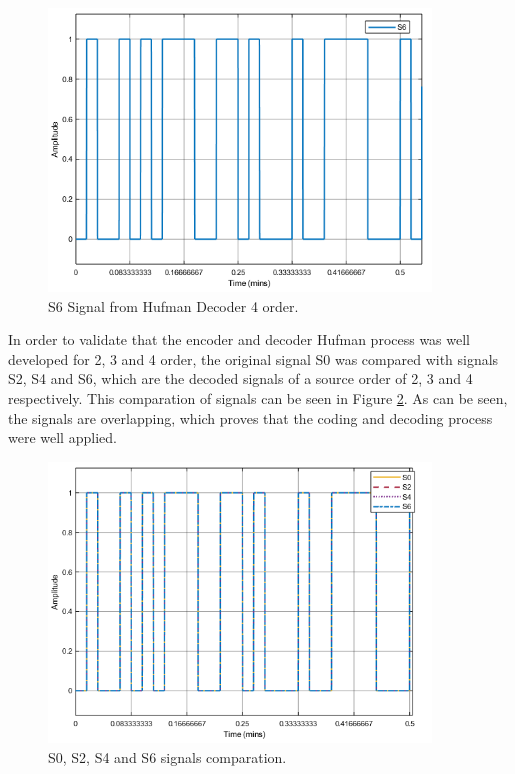 \begin{refsection}
\begin{figure}[!h]
\centering
\includegraphics[width=4in]{./sdf/eit_45550_estimator_source_code_efficiency/figures/S6.png}
\caption[S6 Signal from Hufman Decoder 4 order.]{S6 Signal from Hufman Decoder 4 order.}
\label{f:S6}
\end{figure}

In order to validate that the encoder and decoder Hufman process was well developed for 2, 3 and 4 order, the original signal S0 was compared with signals S2, S4 and S6, which are the decoded signals of a source order of 2, 3 and 4 respectively.
This comparation of signals can be seen in Figure \ref{f:S0S2S4S6}. As can be seen, the signals are overlapping, which proves that the coding and decoding process were well applied.

\begin{figure}[!h]
\centering
\includegraphics[width=4in]{./sdf/eit_45550_estimator_source_code_efficiency/figures/S0S2S4S6.png}
\caption[S0, S2, S4 and S6 signals comparation]{S0, S2, S4 and S6 signals comparation.}
\label{f:S0S2S4S6}
\end{figure}


\end{refsection}

